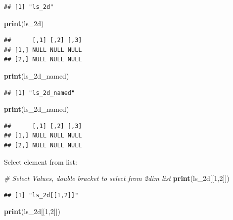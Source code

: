 \documentclass[
]{book}
\newenvironment{Shaded}{\begin{snugshade}}{\end{snugshade}}
\newcommand{\CommentTok}[1]{\textcolor[rgb]{0.56,0.35,0.01}{\textit{#1}}}
\newcommand{\DecValTok}[1]{\textcolor[rgb]{0.00,0.00,0.81}{#1}}
\newcommand{\KeywordTok}[1]{\textcolor[rgb]{0.13,0.29,0.53}{\textbf{#1}}}
\newcommand{\NormalTok}[1]{#1}
\newcommand{\StringTok}[1]{\textcolor[rgb]{0.31,0.60,0.02}{#1}}
\begin{document}
\begin{verbatim}
## [1] "ls_2d"
\end{verbatim}

\begin{Shaded}
\begin{Highlighting}[]
\KeywordTok{print}\NormalTok{(ls\_2d)}
\end{Highlighting}
\end{Shaded}

\begin{verbatim}
##      [,1] [,2] [,3]
## [1,] NULL NULL NULL
## [2,] NULL NULL NULL
\end{verbatim}

\begin{Shaded}
\begin{Highlighting}[]
\KeywordTok{print}\NormalTok{(}\StringTok{\textquotesingle{}ls\_2d\_named\textquotesingle{}}\NormalTok{)}
\end{Highlighting}
\end{Shaded}

\begin{verbatim}
## [1] "ls_2d_named"
\end{verbatim}

\begin{Shaded}
\begin{Highlighting}[]
\KeywordTok{print}\NormalTok{(ls\_2d\_named)}
\end{Highlighting}
\end{Shaded}

\begin{verbatim}
##      [,1] [,2] [,3]
## [1,] NULL NULL NULL
## [2,] NULL NULL NULL
\end{verbatim}

Select element from list:

\begin{Shaded}
\begin{Highlighting}[]
\CommentTok{\# Select Values, double bracket to select from 2dim list}
\KeywordTok{print}\NormalTok{(}\StringTok{\textquotesingle{}ls\_2d[[1,2]]\textquotesingle{}}\NormalTok{)}
\end{Highlighting}
\end{Shaded}

\begin{verbatim}
## [1] "ls_2d[[1,2]]"
\end{verbatim}

\begin{Shaded}
\begin{Highlighting}[]
\KeywordTok{print}\NormalTok{(ls\_2d[[}\DecValTok{1}\NormalTok{,}\DecValTok{2}\NormalTok{]])}
\end{Highlighting}
\end{Shaded}
\end{document}
